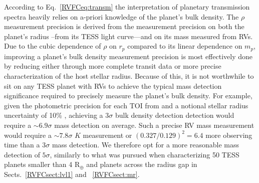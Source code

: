 According to Eq.~\ref{RVFCeq:transm} the interpretation of planetary transmission spectra
heavily relies on a-priori knowledge of the planet's bulk density. The $\rho$ measurement
precision is derived from the measurement precision on both the planet's radius \sigrp{-}--from its
TESS light curve---and on its mass measured from RVs. Due to the cubic dependence
of $\rho$ on $r_p$ compared to its linear dependence on $m_p$, improving a planet's bulk density measurement
precision is most effectively done by reducing \sigrp{} either through more complete
transit data or more precise characterization of the host stellar radius. Because of this, it is not
worthwhile to sit on any TESS planet with RVs to achieve the typical mass detection significance required
to precisely measure the planet's bulk density. For example, given the photometric precision for each TOI
from  and a notional stellar radius uncertainty of 10\% \citep{carter08},
achieving a $3\sigma$ bulk
density detection detection would require a $\sim 6.9\sigma$ mass detection on average. Such a precise RV mass
measurement would require a $\sim 7.8\sigma$ $K$ measurement or $(0.327/0.129)^2 = 6.4$ more observing time
than a $3\sigma$ mass detection. We therefore opt for a more reasonable mass detection of $5\sigma$, similarly to
what was pursued when characterizing 50 TESS planets smaller than 4 R$_{\oplus}$ and planets across the radius gap
in Sects.~\ref{RVFCsect:lvl1} and ~\ref{RVFCsect:mr}. \\

